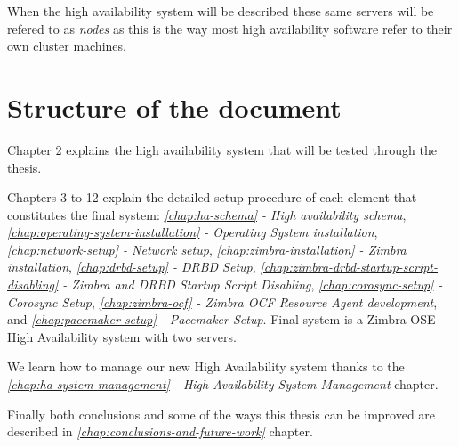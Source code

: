 When the high availability system will be described these same servers will be refered to as \textit{nodes} as this is the way most high availability software refer to their own cluster machines.

\section {Structure of the document}

Chapter 2 explains the high availability system that will be tested through the thesis.

Chapters 3 to 12 explain the detailed setup procedure of each element that constitutes the final system: \textit{\ref{chap:ha-schema} - High availability schema},
\textit{\ref{chap:operating-system-installation} - Operating System installation},
\textit{\ref{chap:network-setup} - Network setup},
\textit{\ref{chap:zimbra-installation} - Zimbra installation},
\textit{\ref{chap:drbd-setup} - DRBD Setup},
\textit{\ref{chap:zimbra-drbd-startup-script-disabling} - Zimbra and DRBD Startup Script Disabling},
\textit{\ref{chap:corosync-setup} - Corosync Setup},
\textit{\ref{chap:zimbra-ocf} - Zimbra OCF Resource Agent development},
and
\textit{\ref{chap:pacemaker-setup} - Pacemaker Setup}.
Final system is a Zimbra OSE High Availability system with two servers.

We learn how to manage our new High Availability system thanks to the \textit{\ref{chap:ha-system-management} - High Availability System Management} chapter.

Finally both conclusions and some of the ways this thesis can be improved are described in \textit{\ref{chap:conclusions-and-future-work}} chapter.

